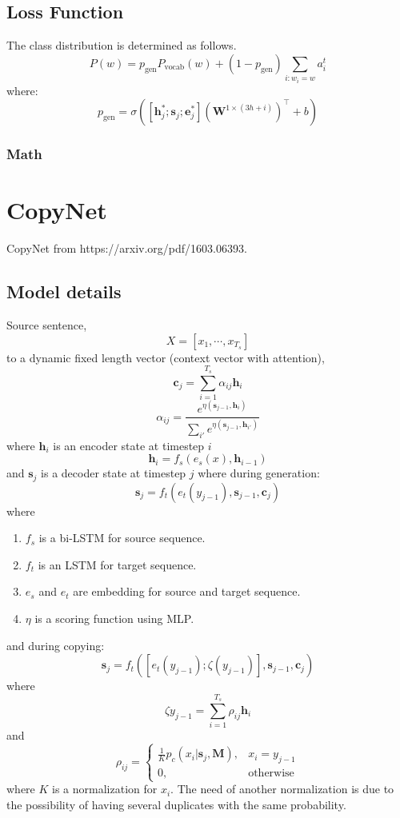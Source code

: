 \documentclass{article}
\begin{document}
  \subsection{Loss Function}
  The class distribution is determined as follows.
  \[
    P(w) = p_{\text{gen}}  P_{\text{vocab}}(w) + (1-p_{\text{gen}})\sum_{i:w_i=w}a_i^t
  \] 
  where:
  \[
    p_{\text{gen}} = \sigma([\mathbf{h}^*_j;\mathbf{s}_j;\mathbf{e}^*_j](\mathbf{W}^{1\times (3h+i)})^\intercal + b)   
  \]






\subsubsection{Math}
\section{CopyNet}
  CopyNet from https://arxiv.org/pdf/1603.06393.
\subsection{Model details}
  Source sentence,
  \[
    X = [x_1, \cdots, x_{T_s}]
  \] to a dynamic fixed length vector (context vector with attention),
  \[
    \mathbf{c}_j = \sum_{i = 1}^{T_s} \alpha_{ij} \mathbf{h}_i
  \]
  \[
    \alpha_{ij} = \frac{e^{\eta(\mathbf{s}_{j-1}, \mathbf{h}_i)}}{\sum_{i'}e^{\eta(\mathbf{s}_{j-1}, \mathbf{h}_{i'})}}
  \]
  where $\mathbf{h}_i$ is an encoder state at timestep $i$
  \[
    \mathbf{h}_i = f_s(e_s(x), \mathbf{h}_{i-1})
  \]
  and $\mathbf{s}_j$ is a decoder state at timestep $j$ where during generation:
  \[
    \mathbf{s}_j = f_t(e_t(y_{j-1}), \mathbf{s}_{j-1}, \mathbf{c}_{j})
  \]
  where
  \begin{enumerate}
    \item $f_s$ is a bi-LSTM for source sequence.
    \item $f_t$ is an LSTM for target sequence.
    \item $e_s$ and $e_t$ are embedding for source and target sequence.
    \item $\eta$ is a scoring function using MLP.
  \end{enumerate}
  and during copying:
  \[
    \mathbf{s}_j = f_t([e_t(y_{j-1}); \zeta(y_{j-1})], \mathbf{s}_{j-1}, \mathbf{c}_{j})
  \]
  where
  \[
    \zeta{y_{j-1}} = \sum_{i=1}^{T_s} \rho_{ij} \mathbf{h}_i
  \]
  and
  \[
    \rho_{ij} =
    \begin{cases}
      \frac{1}{K} p_c(x_i|\mathbf{s}_j, \mathbf{M}), & x_i = y_{j-1} \\
      0, & \text{otherwise}
    \end{cases}
  \]
  where $K$ is a normalization for $x_i$. The need of another normalization is due to the possibility of having several duplicates with the same probability.
\end{document}
